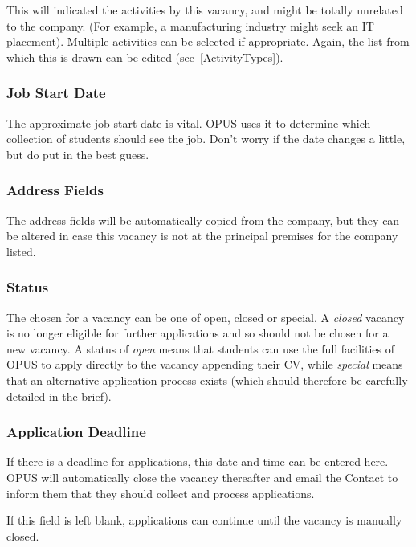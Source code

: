 \documentclass[12 pt]{book}
\begin{document}
This will indicated the activities by this vacancy, and might be totally
unrelated to the company. (For example, a manufacturing industry might seek
an IT placement). Multiple activities can be selected if appropriate. Again,
the list from which this is drawn can be edited (see~\ref{ActivityTypes}).

\subsubsection{Job Start Date}

The approximate job start date is vital. OPUS uses it to determine which
collection of students should see the job. Don't worry if the date changes a
little, but do put in the best guess.

\subsubsection{Address Fields}

The address fields will be automatically copied from the company, but they can
be altered in case this vacancy is not at the principal premises for the 
company listed.

\subsubsection{Status}

The  chosen for a vacancy can be one of open, closed or 
special. A \emph{closed} vacancy is no longer eligible for further applications
and so should not be chosen for a new vacancy. A status of \emph{open} means 
that students can use the full facilities of OPUS to apply directly to the
vacancy appending their CV, while \emph{special} means that an alternative
application process exists (which should therefore be carefully detailed in the
brief).

\subsubsection{Application Deadline}

If there is a deadline for applications, this date and time can be entered 
here. OPUS will automatically close the vacancy thereafter and email the
Contact to inform them that they should collect and process applications.

If this field is left blank, applications can continue until the vacancy is
manually closed.
\end{document}
